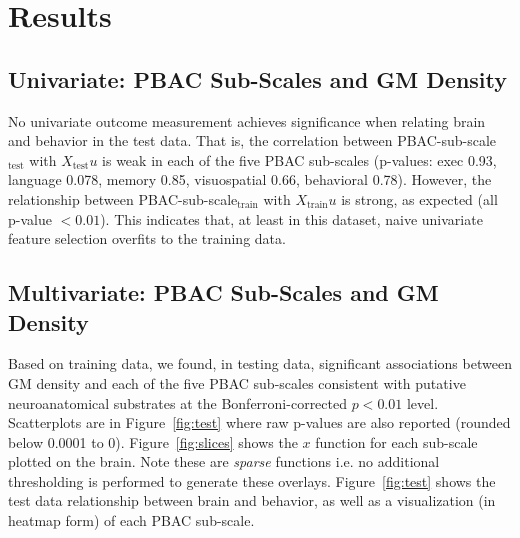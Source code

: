 \documentclass[preprint,authoryear,12pt]{elsarticle}
\begin{document}
\section{Results}

\subsection{Univariate: PBAC Sub-Scales and GM Density} No univariate outcome measurement achieves significance when relating brain and behavior in the test data.  That is, the correlation between PBAC-sub-scale$_\text{test}$ with $X_\text{test} u$ is weak in each of the five PBAC sub-scales (p-values: exec 0.93,  language 0.078,  memory 0.85, visuospatial 0.66, behavioral 0.78).  However, the relationship between PBAC-sub-scale$_\text{train}$ with $X_\text{train} u$ is strong, as expected (all p-value $< 0.01$).  This indicates that, at least in this dataset, naive univariate feature selection overfits to the training data.  

\subsection{Multivariate: PBAC Sub-Scales and GM Density}  
Based on training data, we found, in testing data, significant associations between GM density and each of the five PBAC sub-scales consistent with putative neuroanatomical substrates at the Bonferroni-corrected $p < 0.01$ level.  Scatterplots are in Figure~\ref{fig:test} where raw p-values are also reported (rounded below 0.0001 to 0).  Figure~\ref{fig:slices} shows the $x$ function for each sub-scale plotted on the brain.  Note these are {\em sparse} functions i.e. no additional thresholding is performed to generate these overlays.    Figure~\ref{fig:test} shows the test data relationship between brain and behavior, as well as a visualization (in heatmap form) of each PBAC sub-scale.  
\end{document}
